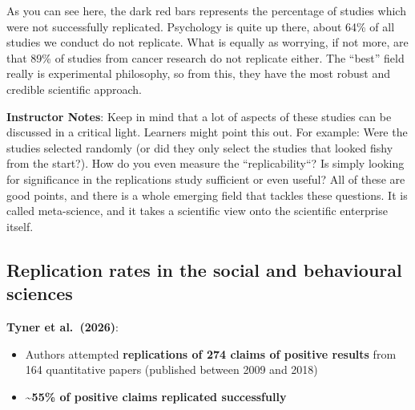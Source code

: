 \documentclass[
  letterpaper,
  DIV=11,
  numbers=noendperiod]{scrartcl}
\providecommand{\tightlist}{%
  \setlength{\itemsep}{0pt}\setlength{\parskip}{0pt}}
\begin{document}
As you can see here, the dark red bars represents the percentage of
studies which were not successfully replicated. Psychology is quite up
there, about 64\% of all studies we conduct do not replicate. What is
equally as worrying, if not more, are that 89\% of studies from cancer
research do not replicate either. The ``best'' field really is
experimental philosophy, so from this, they have the most robust and
credible scientific approach.

\textbf{Instructor Notes}: Keep in mind that a lot of aspects of these
studies can be discussed in a critical light. Learners might point this
out. For example: Were the studies selected randomly (or did they only
select the studies that looked fishy from the start?). How do you even
measure the ``replicability``? Is simply looking for significance in the
replications study sufficient or even useful? All of these are good
points, and there is a whole emerging field that tackles these
questions. It is called meta-science, and it takes a scientific view
onto the scientific enterprise itself.

\subsection{Replication rates in the social and behavioural
sciences}\label{replication-rates-in-the-social-and-behavioural-sciences}

\textbf{Tyner et al.~(2026)}:

\begin{itemize}
\tightlist
\item
  Authors attempted \textbf{replications of 274 claims of positive
  results} from 164 quantitative papers (published between 2009 and
  2018)
\item
  \textbf{\textasciitilde55\% of positive claims replicated
  successfully}
\end{itemize}
\end{document}
